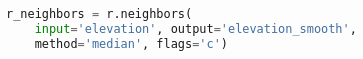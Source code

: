 \documentclass{standalone}
\begin{document}
\begin{lstlisting}[language=Python,linewidth=34.2em]
r_neighbors = r.neighbors(
    input='elevation', output='elevation_smooth',
    method='median', flags='c')
\end{lstlisting}
\end{document}
